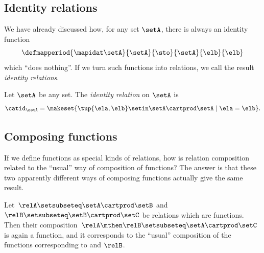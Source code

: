 
\subsection{Identity relations}

We have already discussed how, for any set $\setA$, there is always an identity function
\begin{equation}
    \defmapperiod{
        \mapidat\setA
    }{
        \setA
    }{
        \sto
    }{
        \setA
    }{
        \elb
    }{
        \elb
    }
\end{equation}
which ``does nothing''.
If we turn such functions into relations, we call the result \emph{identity relations}.

\begin{definition}\label{def:identity-relation}
    Let $\setA$ be any set.
    The \emph{identity relation} on $\setA$ is
    \begin{equation}
        \catid_\setA = \makeset { \tup{\ela, \elb} \setin \setA \cartprod \setA \mid \ela = \elb}.
    \end{equation}
\end{definition}


\subsection{Composing functions}

If we define functions as special kinds of relations, how is relation composition related to the ``usual'' way of composition of functions?
The answer is that these two apparently different ways of composing functions actually give the same result.

\begin{lemma}
    \label{lem:comprelfun}
    Let~$\relA \setsubseteq \setA \cartprod \setB$ and~$\relB \setsubseteq \setB \cartprod \setC$ be relations which are functions.
    Then their composition~$\relA \mthen \relB \setsubseteq \setA \cartprod \setC$ is again a function, and it corresponds to the ``usual'' composition of the functions corresponding to \relA and $\relB$.
\end{lemma}

